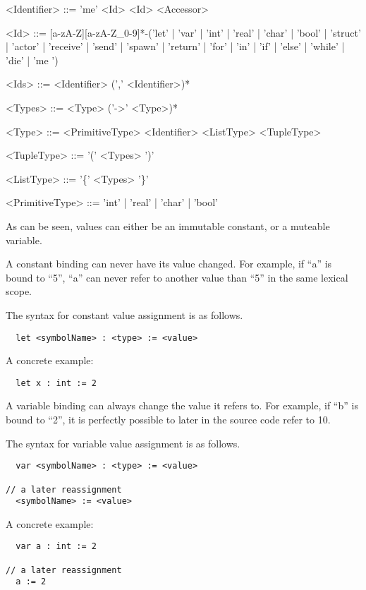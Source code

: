\begin{grammar}
<Identifier> ::= 'me'
 \alt <Id>
 \alt <Id> <Accessor>

<Id> ::= [a-zA-Z][a-zA-Z\_0-9]*-('let' | 'var' | 'int' | 'real' | 'char' | 'bool' | 'struct' | 'actor' | 'receive' | 'send' | 'spawn' | 'return' | 'for' | 'in' | 'if' | 'else' | 'while' | 'die' | 'me ')

<Ids> ::= <Identifier> (',' <Identifier>)*

<Types> ::= <Type> ('->' <Type>)*

<Type> ::= <PrimitiveType>
 \alt <Identifier>
 \alt <ListType>
 \alt <TupleType>

<TupleType> ::= '(' <Types> ')'

<ListType> ::= '\{' <Types> '\}'

<PrimitiveType> ::= 'int' | 'real' | 'char' | 'bool'
\end{grammar}

As can be seen, values can either be an immutable constant, or a muteable variable.

A constant binding can never have its value changed. For example, if \enquote{a} is bound to \enquote{5}, \enquote{a} can never refer to another value than \enquote{5} in the same lexical scope. 

The syntax for constant value assignment is as follows.
\begin{verbatim}
  let <symbolName> : <type> := <value>
\end{verbatim}
A concrete example:

\begin{verbatim}
  let x : int := 2
\end{verbatim}

A variable binding can always change the value it refers to. For example, if \enquote{b} is bound to \enquote{2}, it is perfectly possible to later in the source code refer to {10}.

The syntax for variable value assignment is as follows.

\begin{verbatim}
  var <symbolName> : <type> := <value>

// a later reassignment
  <symbolName> := <value>
\end{verbatim}
A concrete example:

\begin{verbatim}
  var a : int := 2
  
// a later reassignment
  a := 2
\end{verbatim}

